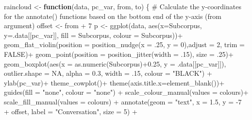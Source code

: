 \documentclass[
  letterpaper,
  DIV=11,
  numbers=noendperiod]{scrreprt}
\newenvironment{Shaded}{\begin{snugshade}}{\end{snugshade}}
\newcommand{\AttributeTok}[1]{\textcolor[rgb]{0.40,0.45,0.13}{#1}}
\newcommand{\CommentTok}[1]{\textcolor[rgb]{0.37,0.37,0.37}{#1}}
\newcommand{\ConstantTok}[1]{\textcolor[rgb]{0.56,0.35,0.01}{#1}}
\newcommand{\ControlFlowTok}[1]{\textcolor[rgb]{0.00,0.23,0.31}{\textbf{#1}}}
\newcommand{\DecValTok}[1]{\textcolor[rgb]{0.68,0.00,0.00}{#1}}
\newcommand{\FloatTok}[1]{\textcolor[rgb]{0.68,0.00,0.00}{#1}}
\newcommand{\FunctionTok}[1]{\textcolor[rgb]{0.28,0.35,0.67}{#1}}
\newcommand{\NormalTok}[1]{\textcolor[rgb]{0.00,0.23,0.31}{#1}}
\newcommand{\OtherTok}[1]{\textcolor[rgb]{0.00,0.23,0.31}{#1}}
\newcommand{\SpecialCharTok}[1]{\textcolor[rgb]{0.37,0.37,0.37}{#1}}
\newcommand{\StringTok}[1]{\textcolor[rgb]{0.13,0.47,0.30}{#1}}
\begin{document}
\begin{Shaded}
\begin{Highlighting}[]
\NormalTok{raincloud }\OtherTok{\textless{}{-}} \ControlFlowTok{function}\NormalTok{(data, pc\_var, from, to) \{}
  \CommentTok{\# Calculate the y{-}coordinates for the annotate() functions based on the bottom end of the y{-}axis (\textquotesingle{}from\textquotesingle{} argument)}
\NormalTok{  offset }\OtherTok{\textless{}{-}}\NormalTok{ from }\SpecialCharTok{+} \DecValTok{7}
\NormalTok{  p }\OtherTok{\textless{}{-}} \FunctionTok{ggplot}\NormalTok{(data, }\FunctionTok{aes}\NormalTok{(}\AttributeTok{x=}\NormalTok{Subcorpus, }\AttributeTok{y=}\NormalTok{.data[[pc\_var]], }\AttributeTok{fill =}\NormalTok{ Subcorpus, }\AttributeTok{colour =}\NormalTok{ Subcorpus))}\SpecialCharTok{+}
    \FunctionTok{geom\_flat\_violin}\NormalTok{(}\AttributeTok{position =} \FunctionTok{position\_nudge}\NormalTok{(}\AttributeTok{x =}\NormalTok{ .}\DecValTok{25}\NormalTok{, }\AttributeTok{y =} \DecValTok{0}\NormalTok{),}\AttributeTok{adjust =} \DecValTok{2}\NormalTok{, }\AttributeTok{trim =} \ConstantTok{FALSE}\NormalTok{)}\SpecialCharTok{+}
    \FunctionTok{geom\_point}\NormalTok{(}\AttributeTok{position =} \FunctionTok{position\_jitter}\NormalTok{(}\AttributeTok{width =}\NormalTok{ .}\DecValTok{15}\NormalTok{), }\AttributeTok{size =}\NormalTok{ .}\DecValTok{25}\NormalTok{)}\SpecialCharTok{+}
    \FunctionTok{geom\_boxplot}\NormalTok{(}\FunctionTok{aes}\NormalTok{(}\AttributeTok{x =} \FunctionTok{as.numeric}\NormalTok{(Subcorpus)}\SpecialCharTok{+}\FloatTok{0.25}\NormalTok{, }\AttributeTok{y =}\NormalTok{ .data[[pc\_var]]), }\AttributeTok{outlier.shape =} \ConstantTok{NA}\NormalTok{, }\AttributeTok{alpha =} \FloatTok{0.3}\NormalTok{, }\AttributeTok{width =}\NormalTok{ .}\DecValTok{15}\NormalTok{, }\AttributeTok{colour =} \StringTok{"BLACK"}\NormalTok{) }\SpecialCharTok{+}
    \FunctionTok{ylab}\NormalTok{(pc\_var)}\SpecialCharTok{+}
    \FunctionTok{theme\_cowplot}\NormalTok{()}\SpecialCharTok{+}
    \FunctionTok{theme}\NormalTok{(}\AttributeTok{axis.title.x=}\FunctionTok{element\_blank}\NormalTok{())}\SpecialCharTok{+}
    \FunctionTok{guides}\NormalTok{(}\AttributeTok{fill =} \StringTok{"none"}\NormalTok{, }\AttributeTok{colour =} \StringTok{"none"}\NormalTok{) }\SpecialCharTok{+}
    \FunctionTok{scale\_colour\_manual}\NormalTok{(}\AttributeTok{values =}\NormalTok{ colours)}\SpecialCharTok{+}
    \FunctionTok{scale\_fill\_manual}\NormalTok{(}\AttributeTok{values =}\NormalTok{ colours) }\SpecialCharTok{+}
    \FunctionTok{annotate}\NormalTok{(}\AttributeTok{geom =} \StringTok{"text"}\NormalTok{, }\AttributeTok{x =} \FloatTok{1.5}\NormalTok{, }\AttributeTok{y =} \SpecialCharTok{{-}}\DecValTok{7} \SpecialCharTok{+}\NormalTok{ offset, }\AttributeTok{label =} \StringTok{"Conversation"}\NormalTok{, }\AttributeTok{size =} \DecValTok{5}\NormalTok{) }\SpecialCharTok{+}

\end{Highlighting}
\end{Shaded}
\end{document}
